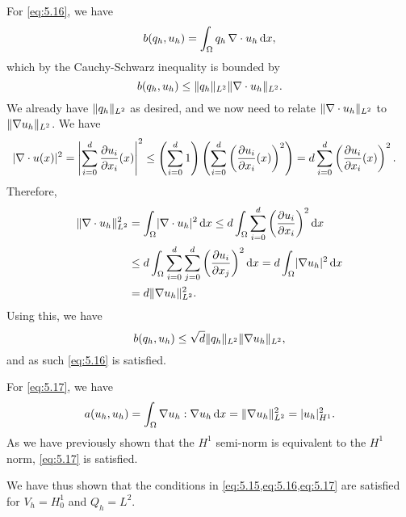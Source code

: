 \begin{solution}{5.1}
    For \cref{eq:5.16}, we have
    \begin{equation}
        b(q_h, u_h) = \int_{\Omega} q_h \, \nabla \cdot u_h \diff x,
    \end{equation}
    which by the Cauchy-Schwarz inequality is bounded by
    \begin{equation}
        b(q_h, u_h) \leq \norm{q_h}_{L^2} \norm{\nabla \cdot u_h}_{L^2}.
    \end{equation}
    We already have $\norm{q_h}_{L^2}$ as desired, and we now need to relate $\norm{\nabla \cdot u_h}_{L^2}$ to $\norm{\nabla u_h}_{L^2}$.
    We have
    \begin{align*}
        \abs{\nabla \cdot u(x)}^2
        &= \abs*{\sum_{i = 0}^{d} \frac{\partial u_i}{\partial x_i}(x)}^2
        \leq \left(
            \sum_{i = 0}^{d} 1
        \right) \left(
            \sum_{i = 0}^{d} \left( \frac{\partial u_i}{\partial x_i}(x) \right)^2
        \right)
        = d \sum_{i = 0}^{d} \left( \frac{\partial u_i}{\partial x_i}(x) \right)^2.
    \end{align*}
    Therefore,
    \begin{align*}
        \norm{\nabla \cdot u_h}_{L^2}^2
        &= \int_{\Omega} \abs{\nabla \cdot u_h}^2 \diff x
        \leq d \int_{\Omega} \sum_{i = 0}^{d} \left(
            \frac{\partial u_i}{\partial x_i}
        \right)^2 \diff x \\
        &\leq d \int_{\Omega} \sum_{i = 0}^{d} \sum_{j = 0}^{d} \left(
            \frac{\partial u_i}{\partial x_j}
        \right)^2 \diff x
        = d \int_{\Omega} \abs{\nabla u_h}^2 \diff x \\
        &= d \norm{\nabla u_h}_{L^2}^2.
    \end{align*}
    Using this, we have
    \begin{equation}
        b(q_h, u_h) \leq \sqrt{d} \norm{q_h}_{L^2} \norm{\nabla u_h}_{L^2},
    \end{equation}
    and as such \cref{eq:5.16} is satisfied.

    For \cref{eq:5.17}, we have
    \begin{equation}
        a(u_h, u_h)
        = \int_{\Omega} \nabla u_h : \nabla u_h \diff x
        = \norm{\nabla u_h}_{L^2}^2 = \abs{u_h}_{H^1}^2.
    \end{equation}
    As we have previously shown that the $H^1$ semi-norm is equivalent to the $H^1$ norm, \cref{eq:5.17} is satisfied.

    We have thus shown that the conditions in \cref{eq:5.15,eq:5.16,eq:5.17} are satisfied for $V_h = H^1_0$ and $Q_h = L^2$.
\end{solution}

